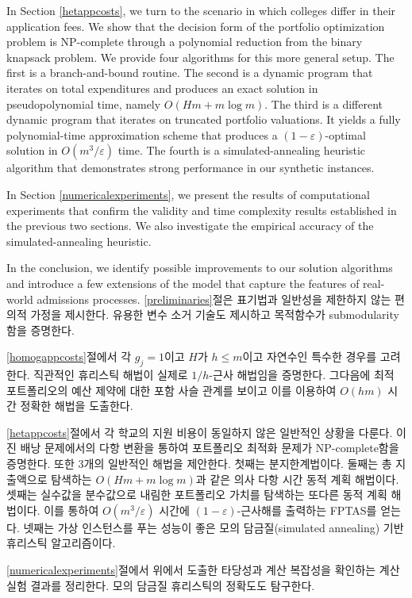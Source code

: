 \documentclass[11pt]{article} %
\theoremstyle{definition}
\theoremstyle{definition}
\begin{document}
In Section \ref{hetappcosts}, we turn to the scenario in which colleges differ in their application fees. We show that the decision form of the portfolio optimization problem is NP-complete through a polynomial reduction from the binary knapsack problem. We provide four algorithms for this more general setup. The first is a branch-and-bound routine. The second is a dynamic program that iterates on total expenditures and produces an exact solution in pseudopolynomial time, namely $O(Hm + m \log m)$. The third is a different dynamic program that iterates on truncated portfolio valuations. It yields a fully polynomial-time approximation scheme that produces a $(1 - \varepsilon)$-optimal solution in $O(m^3 / \varepsilon)$ time.  The fourth is a simulated-annealing heuristic algorithm that demonstrates strong performance in our synthetic instances. 

In Section \ref{numericalexperiments}, we present the results of computational experiments that confirm the validity and time complexity results established in the previous two sections. We also investigate the empirical accuracy of the simulated-annealing heuristic.

In the conclusion, we identify possible improvements to our solution algorithms and introduce a few extensions of the model that capture the features of real-world admissions processes.
\else
\ref{preliminaries}절은 표기법과 일반성을 제한하지 않는 편의적 가정을 제시한다. 유용한 변수 소거 기술도 제시하고 목적함수가 submodularity함을 
증명한다.
 
\ref{homogappcosts}절에서 각 $g_j = 1$이고 $H$가 $h \leq m$이고 자연수인 특수한 경우를 고려한다. 직관적인 휴리스틱 해법이 실제로 $1/h$-근사 해법임을 증명한다. 그다음에 최적 포트폴리오의 예산 제약에 대한 포함 사슬 관계를 보이고 이를 이용하여 $O(hm)$ 시간 정확한 해법을 도출한다. 

\ref{hetappcosts}절에서 각 학교의 지원 비용이 동일하지 않은 일반적인 상황을 다룬다. 이진 배낭 문제에서의 다항 변환을 통하여 포트폴리오 최적화 문제가 NP-complete함을 증명한다. 또한 3개의 일반적인 해법을 제안한다. 첫째는 분지한계법이다. 둘째는 총 지출액으로 탐색하는 $O(Hm + m \log m)$과 같은 의사 다항 시간 동적 계획 해법이다. 셋째는 실수값을 분수값으로 내림한 포트폴리오 가치를 탐색하는 또다른 동적 계획 해법이다. 이를 통하여 $O(m^3 / \varepsilon)$ 시간에 $(1 - \varepsilon)$-근사해를 출력하는 FPTAS를 얻는다. 넷째는 가상 인스턴스를 푸는 성능이 좋은 모의 담금질(simulated annealing) 기반 휴리스틱 알고리즘이다.

\ref{numericalexperiments}절에서 위에서 도출한 타당성과 계산 복잡성을 확인하는 계산 실험 결과를 정리한다. 모의 담금질 휴리스틱의 정확도도 탐구한다.
\end{document}
